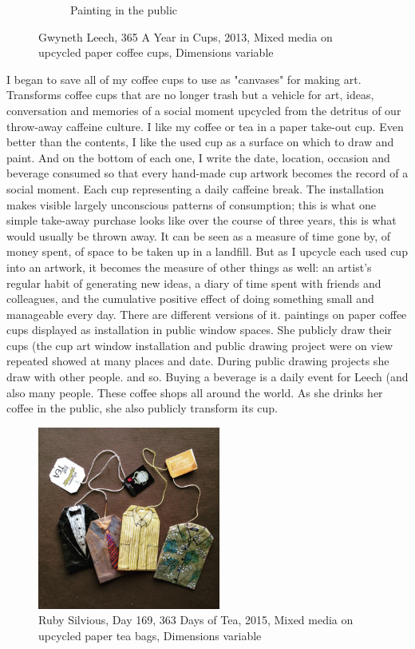 \begin{figure}[h!]
\begin{subfigure}{.47\textwidth}
  \caption{Painting in the public}
  \label{fig:GwynethLeech_Public}
\end{subfigure}
\caption{Gwyneth Leech, 365 A Year in Cups, 2013, Mixed media on upcycled paper coffee cups, Dimensions variable}
\label{fig:GwynethLeech_CoffeeCups}
\end{figure}

I began to save all of my coffee cups to use as "canvases" for making art. Transforms coffee cups that are no longer trash but a vehicle for art, ideas, conversation and memories of a social moment upcycled from the detritus of our throw-away caffeine culture. I like my coffee or tea in a paper take-out cup. Even better than the contents, I like the used cup as a surface on which to draw and paint. And on the bottom of each one, I write the date, location, occasion and beverage consumed so that every hand-made cup artwork becomes the record of a social moment. Each cup representing a daily caffeine break. The installation makes visible largely unconscious patterns of consumption; this is what one simple take-away purchase looks like over the course of three years, this is what would usually be thrown away. It can be seen as a measure of time gone by, of money spent, of space to be taken up in a landfill. But as I upcycle each used cup into an artwork, it becomes the measure of other things as well: an artist's regular habit of generating new ideas, a diary of time spent with friends and colleagues, and the cumulative positive effect of doing something small and manageable every day. There are different versions of it. paintings on paper coffee cups displayed as installation in public window spaces. She publicly draw their cups (the cup art window installation and public drawing project were on view repeated showed at many places and date. During public drawing projects she draw with other people. and so. Buying a beverage is a daily event for Leech (and also many people. These coffee shops all around the world. As she drinks her coffee in the public, she also publicly transform its cup.


\begin{figure}[h!]
  \centering
  \includegraphics[height=6cm]{graphics/rubysilvious-teabag-Day169.jpg}
  \caption{Ruby Silvious, Day 169, 363 Days of Tea, 2015, Mixed media on upcycled paper tea bags, Dimensions variable}
  \label{fig:RubySilvious_TeaBag}
\end{figure}
  
